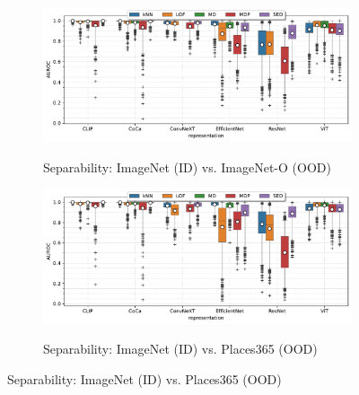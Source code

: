 \begin{figure}[t]
    \centering
    \vspace{-0.5em}
    \begin{subfigure}[b]{0.9\textwidth}
        \centering
        \caption{\small Separability: ImageNet (ID) vs. ImageNet-O (OOD)}
        \includegraphics[width=\textwidth]{images/real-separability/barplot-ImageNet-auroc(representation,model)-representation_CLIP,CoCa,ConvNeXT,EfficientNet,ResNet,ViT-class_0,999-data_ImageNet-O.pdf}
        \label{fig:image-auroc-imagenet-o}
    \end{subfigure}

    \vspace{-0.5em}
    \begin{subfigure}[b]{0.9\textwidth}
        \centering
        \caption{\small Separability: ImageNet (ID) vs. Places365 (OOD)}
        \includegraphics[width=\textwidth]{images/real-separability/barplot-ImageNet-auroc(representation,model)-representation_CLIP,CoCa,ConvNeXT,EfficientNet,ResNet,ViT-class_0,999-data_Places365.pdf}
        \label{fig:image-auroc-places365}
    \end{subfigure}


\end{figure}
